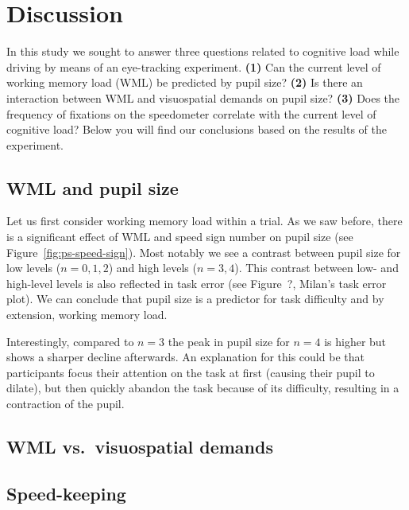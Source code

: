 
\section{Discussion}\label{sec:discussion}
In this study we sought to answer three questions related to cognitive load while driving by means of an eye-tracking experiment.
\textbf{(1)} Can the current level of working memory load (WML) be predicted by pupil size?
\textbf{(2)} Is there an interaction between WML and visuospatial demands on pupil size?
\textbf{(3)} Does the frequency of fixations on the speedometer correlate with the current level of cognitive load?
Below you will find our conclusions based on the results of the experiment.

\subsection{WML and pupil size}
Let us first consider working memory load within a trial.
As we saw before, there is a significant effect of WML and speed sign number on pupil size (see Figure~\ref{fig:ps-speed-sign}).
Most notably we see a contrast between pupil size for low \nback levels (\(n = 0,1,2\)) and high \nback levels (\(n = 3,4\)). 
This contrast between low- and high-level \nback levels is also reflected in task error (see Figure~?, Milan's task error plot).
We can conclude that pupil size is a predictor for task difficulty and by extension, working memory load. 

Interestingly, compared to \(n = 3\) the peak in pupil size for \(n = 4\) is higher but shows a sharper decline afterwards.
An explanation for this could be that participants focus their attention on the task at first (causing their pupil to dilate), but then quickly abandon the task because of its difficulty, resulting in a contraction of the pupil.

\subsection{WML vs.\ visuospatial demands}


\subsection{Speed-keeping}
